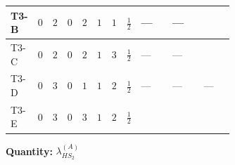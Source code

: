 \documentclass[8pt]{article}
\begin{document}
\begin{landscape}
\begin{longtable}{@{}llcccccc >{\raggedright\arraybackslash}p{0.21\linewidth} >{\raggedright\arraybackslash}p{0.21\linewidth} >{\raggedright\arraybackslash}p{0.21\linewidth}@{}}
\midrule
T3-B & $0$ & $2$ & $0$ & $2$ & $1$ & $1$ & $\frac{1}{2}$ & --- & --- & \scriptsize\adjustbox{max width=\linewidth}{$\begin{gathered} +{g_1}^2 \left(12 {g_2}^2-\frac{15 {\lambda_{HS_2}^{(A)}}}{2}\right)\end{gathered}$} \\
\midrule
T3-C & $0$ & $2$ & $0$ & $2$ & $1$ & $3$ & $\frac{1}{2}$ & --- & --- & \scriptsize\adjustbox{max width=\linewidth}{$\begin{gathered} +{g_1}^2 \left(12 {g_2}^2-\frac{15 {\lambda_{HS_2}^{(A)}}}{2}\right)\end{gathered}$} \\
\midrule
T3-D & $0$ & $3$ & $0$ & $1$ & $1$ & $2$ & $\frac{1}{2}$ & --- & --- & --- \\
\midrule
T3-E & $0$ & $3$ & $0$ & $3$ & $1$ & $2$ & $\frac{1}{2}$ & \scriptsize\adjustbox{max width=\linewidth}{$\begin{gathered} {\lambda_{HS_2}^{(A)}} (6 \operatorname{Tr}\!\left({Y_d}\,\left({Y_d}\right)^{\dagger}\right)+2 \operatorname{Tr}\!\left({Y_e}\,\left({Y_e}\right)^{\dagger}\right)+6 \operatorname{Tr}\!\left({Y_u}\,\left({Y_u}\right)^{\dagger}\right)+16 {\lambda_{S_2}^{(A)}})\end{gathered}$} & \scriptsize\adjustbox{max width=\linewidth}{$\begin{gathered} -\frac{8}{9} {\lambda_5} \left({\lambda_5}\right)^{*}\end{gathered}$} & \scriptsize\adjustbox{max width=\linewidth}{$\begin{gathered} +{g_1}^2 \left(4 {g_2}^2-\frac{15 {\lambda_{HS_2}^{(A)}}}{2}\right)\end{gathered}$} \\
\midrule
\bottomrule
\end{longtable}
\clearpage
\noindent\textbf{Quantity: }$\lambda_{HS_2}^{(A)}$\par\smallskip

\end{landscape}
\end{document}
